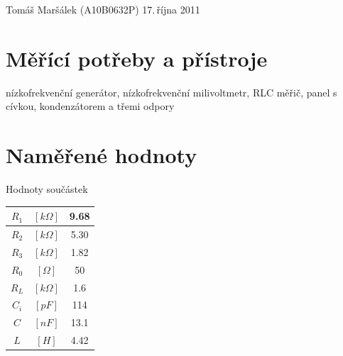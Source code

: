 \documentclass[10pt]{article}
\begin{document}
 {Tomáš Maršálek}
 {(A10B0632P)}
 {17.\,října 2011}


\section{Měřící potřeby a přístroje}
nízkofrekvenční generátor, nízkofrekvenční milivoltmetr, RLC měřič, 
panel s cívkou, kondenzátorem a třemi odpory

\section{Naměřené hodnoty}

\begin{minipage}[t]{0.5\textwidth}
\begin{flushleft}
Hodnoty součástek  \\[.2cm]
\begin{tabular}[b]{|cc|c|}
\hline
$R_1$ & $[k\Omega]$ & 9.68 \\
\hline
$R_2$ & $[k\Omega]$ & 5.30 \\
\hline
$R_3$ & $[k\Omega]$ & 1.82 \\
\hline
$R_0$ & $[\Omega]$  & 50   \\
\hline
$R_L$ & $[k\Omega]$ & 1.6  \\
\hline
$C_i$ & $[pF]$      & 114  \\
\hline
$C$ & $[nF]$        & 13.1 \\
\hline
$L$ & $[H]$         & 4.42 \\
\hline
\end{tabular} \\
\end{flushleft}
\end{minipage}
\end{document}
